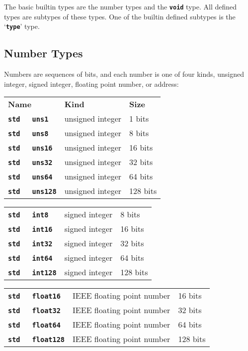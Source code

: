 \documentclass[12pt]{article}
\makeatletter
\newcommand{\TT}[1]{{\tt \bfseries #1}}
\newcommand{\ttkey}[1]{\TT{#1}\index{#1@{\tt #1}}}
\newenvironment{indpar}[1][0.3in]%
	{\begin{list}{}%
		     {\setlength{\itemsep}{0in}%
		      \setlength{\topsep}{0in}%
		      \setlength{\parsep}{1ex}%
		      \setlength{\labelwidth}{#1}%
		      \setlength{\leftmargin}{#1}%
		      \addtolength{\leftmargin}{\labelsep}}%
	 \item}%
	{\end{list}}
\makeatother
\begin{document}
The basic builtin types are the number types and the \TT{void} type.
All defined types are subtypes of these types.
One of the builtin defined subtypes is the `\TT{type}' type.

\subsection{Number Types}
\label{NUMBER-TYPES}

Numbers are sequences of bits, and each number is one of
four kinds, unsigned integer, signed integer, floating point number,
or address:

\begin{indpar}
\begin{tabular}{p{1.5in}@{~~~~~~}p{2in}@{~~~~~~}l}
\bf Name & \bf Kind & \bf Size \\[2ex]
\TT{std}~~~\ttkey{uns1}		& unsigned integer & 1 bits \\
\TT{std}~~~\ttkey{uns8}		& unsigned integer & 8 bits \\
\TT{std}~~~\ttkey{uns16}	& unsigned integer & 16 bits \\
\TT{std}~~~\ttkey{uns32}	& unsigned integer & 32 bits \\
\TT{std}~~~\ttkey{uns64}	& unsigned integer & 64 bits \\
\TT{std}~~~\ttkey{uns128}	& unsigned integer & 128 bits
\end{tabular}

\begin{tabular}{p{1.5in}@{~~~~~~}p{2in}@{~~~~~~}l}
\TT{std}~~~\ttkey{int8}		& signed integer & 8 bits \\
\TT{std}~~~\ttkey{int16}	& signed integer & 16 bits \\
\TT{std}~~~\ttkey{int32}	& signed integer & 32 bits \\
\TT{std}~~~\ttkey{int64}	& signed integer & 64 bits \\
\TT{std}~~~\ttkey{int128}	& signed integer & 128 bits
\end{tabular}

\begin{tabular}{p{1.5in}@{~~~~~~}p{2in}@{~~~~~~}l}
\TT{std}~~~\ttkey{float16}	& IEEE floating point number & 16 bits \\
\TT{std}~~~\ttkey{float32}	& IEEE floating point number & 32 bits \\
\TT{std}~~~\ttkey{float64}	& IEEE floating point number & 64 bits \\
\TT{std}~~~\ttkey{float128}	& IEEE floating point number & 128 bits
\end{tabular}


\end{indpar}
\end{document}

